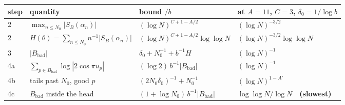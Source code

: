 \documentclass[11pt,a4paper]{article}
\theoremstyle{plain}
\theoremstyle{definition}
\theoremstyle{remark}
\begin{document}
\begin{center}
\begin{tabular}{@{}llll@{}}
\toprule
step & quantity & bound $/b$ & at $A=11$, $C=3$, $\delta_0=1/\log b$\\
\midrule
2 & $\max_{n\le N_0}|S_B(\alpha_n)|$ & $(\log N)^{C+1-A/2}$ & $(\log N)^{-3/2}$\\
2 & $H(\theta)=\sum_{n\le N_0}n^{-1}|S_B(\alpha_n)|$
  & $(\log N)^{C+1-A/2}\log\log N$ & $(\log N)^{-3/2}\log\log N$\\
3 & $|B_{\mathrm{bad}}|$ & $\delta_0+N_0^{-1}+b^{-1}H$ & $(\log N)^{-1}$\\
4a & $\sum_{p\in B_{\mathrm{bad}}}\log|2\cos\pi u_p|$ & $(\log2)\,b^{-1}|B_{\mathrm{bad}}|$
  & $(\log N)^{-1}$\\
4b & tails past $N_0$, good $p$ & $(2N_0\delta_0)^{-1}+N_0^{-1}$ & $(\log N)^{1-A'}$\\
4c & $B_{\mathrm{bad}}$ inside the head & $(1+\log N_0)\,b^{-1}|B_{\mathrm{bad}}|$
  & $\log\log N/\log N$\ \ \textbf{(slowest)}\\
\bottomrule
\end{tabular}
\end{center}
\end{document}
